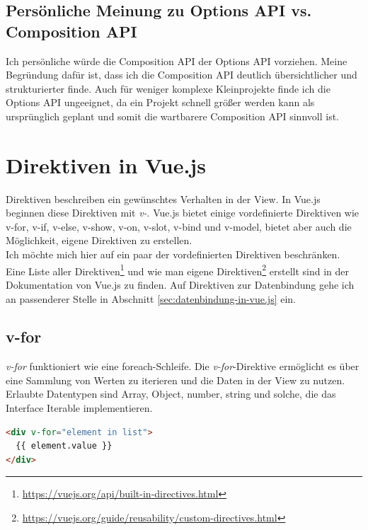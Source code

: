 \subsection*{Persönliche Meinung zu Options API vs. Composition API}
Ich persönliche würde die Composition API der Options API vorziehen.
Meine Begründung dafür ist, dass ich die Composition API deutlich übersichtlicher
und strukturierter finde.
Auch für weniger komplexe Kleinprojekte finde ich die Options API ungeeignet,
da ein Projekt schnell größer werden kann als ursprünglich geplant und somit die
wartbarere Composition API sinnvoll ist.


\section{Direktiven in Vue.js}\label{sec:direktiven-in-vue.js}
Direktiven beschreiben ein gewünschtes Verhalten in der View.
In Vue.js beginnen diese Direktiven mit \emph{v-}.
Vue.js bietet einige vordefinierte Direktiven wie v-for, v-if, v-else, v-show, v-on, v-slot, v-bind
und v-model, bietet aber auch die Möglichkeit, eigene Direktiven zu erstellen. \cite[S. 10]{steyer2019}
\\
Ich möchte mich hier auf ein paar der vordefinierten Direktiven beschränken.
Eine Liste aller Direktiven\footnote{\url{https://vuejs.org/api/built-in-directives.html}}
und wie man eigene Direktiven\footnote{\url{https://vuejs.org/guide/reusability/custom-directives.html}}
erstellt sind in der Dokumentation von Vue.js zu finden.
Auf Direktiven zur Datenbindung gehe ich an passenderer Stelle in Abschnitt \ref{sec:datenbindung-in-vue.js} ein.


\subsection*{v-for}
\emph{v-for} funktioniert wie eine foreach-Schleife.
Die \emph{v-for}-Direktive ermöglicht es über eine Sammlung von Werten zu iterieren und die Daten in der View zu nutzen.
Erlaubte Datentypen sind Array, Object, number, string und solche, die das Interface Iterable implementieren. \cite{vueDirectives}
\begin{lstlisting}[caption={\emph{v-for}-Direktive},language=html, label={lst:v-for}]
<div v-for="element in list">
  {{ element.value }}
</div>
\end{lstlisting}



